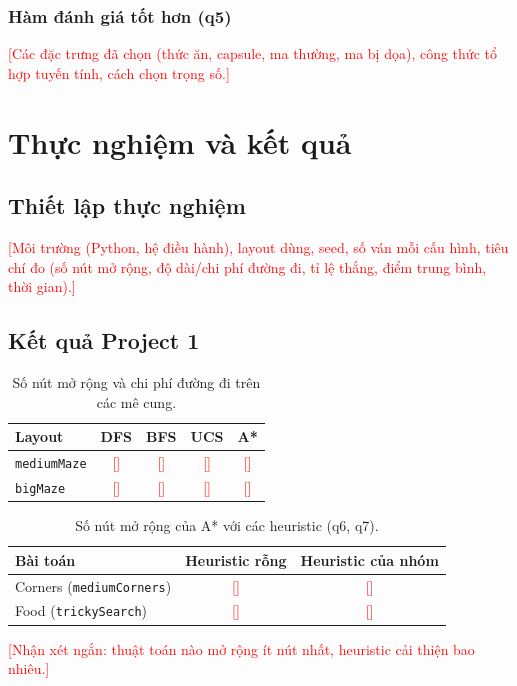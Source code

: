 \documentclass[conference]{IEEEtran}
\newcommand{\todo}[1]{\textcolor{red}{[#1]}}
\begin{document}
\subsubsection{Hàm đánh giá tốt hơn (q5)}
\todo{Các đặc trưng đã chọn (thức ăn, capsule, ma thường, ma bị dọa), công thức tổ hợp tuyến tính, cách chọn trọng số.}

\section{Thực nghiệm và kết quả}

\subsection{Thiết lập thực nghiệm}
\todo{Môi trường (Python, hệ điều hành), layout dùng, seed, số ván mỗi cấu hình, tiêu chí đo (số nút mở rộng, độ dài/chi phí đường đi, tỉ lệ thắng, điểm trung bình, thời gian).}

\subsection{Kết quả Project 1}
\begin{table}[!ht]
    \centering
    \caption{Số nút mở rộng và chi phí đường đi trên các mê cung.}
    \label{tab:p1}
    \begin{tabular}{lcccc}
    \toprule
    Layout & DFS & BFS & UCS & A* \\
    \midrule
    \texttt{mediumMaze} & \todo{} & \todo{} & \todo{} & \todo{} \\
    \texttt{bigMaze} & \todo{} & \todo{} & \todo{} & \todo{} \\
    \bottomrule
    \end{tabular}
\end{table}

\begin{table}[!ht]
    \centering
    \caption{Số nút mở rộng của A* với các heuristic (q6, q7).}
    \label{tab:heur}
    \begin{tabular}{lcc}
    \toprule
    Bài toán & Heuristic rỗng & Heuristic của nhóm \\
    \midrule
    Corners (\texttt{mediumCorners}) & \todo{} & \todo{} \\
    Food (\texttt{trickySearch}) & \todo{} & \todo{} \\
    \bottomrule
    \end{tabular}
\end{table}
\todo{Nhận xét ngắn: thuật toán nào mở rộng ít nút nhất, heuristic cải thiện bao nhiêu.}
\end{document}
